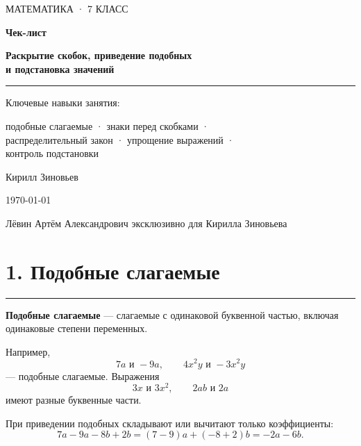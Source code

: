 \documentclass[a4paper,12pt]{article}
\newcommand{\topicline}{\par\noindent\color{accent}\rule{\linewidth}{0.6pt}\color{black}\par}
\newcommand{\term}[1]{\textbf{\color{darkaccent}#1}}
\begin{document}
\begin{titlepage}
\thispagestyle{empty}
\begin{center}
\vspace*{1.8cm}
{\large\color{textgray}МАТЕМАТИКА · 7 КЛАСС\par}
\vspace{1.2cm}
{\Huge\bfseries\color{darkaccent}Чек-лист\par}
\vspace{0.45cm}
{\LARGE\bfseries Раскрытие скобок, приведение подобных\\[0.15cm] и подстановка значений\par}
\vspace{1cm}
\topicline
\vspace{0.9cm}
{\large Ключевые навыки занятия:\par}
\vspace{0.3cm}
{\large подобные слагаемые · знаки перед скобками ·\\ распределительный закон · упрощение выражений ·\\ контроль подстановки\par}
\vfill
{\large Кирилл Зиновьев\par}
\vspace{0.35cm}
{\normalsize \today\par}
\vspace{1cm}
{\normalsize Лёвин Артём Александрович эксклюзивно для Кирилла Зиновьева\par}
\vspace{1.4cm}
\end{center}
\end{titlepage}

\section*{1. Подобные слагаемые}
\topicline
\term{Подобные слагаемые} --- слагаемые с одинаковой буквенной частью, включая одинаковые степени переменных.

Например,
\[
7a \text{ и } -9a,\qquad 4x^2y \text{ и } -3x^2y
\]
--- подобные слагаемые. Выражения
\[
3x \text{ и } 3x^2,\qquad 2ab \text{ и } 2a
\]
имеют разные буквенные части.

При приведении подобных складывают или вычитают только коэффициенты:
\[
7a-9a-8b+2b=(7-9)a+(-8+2)b=-2a-6b.
\]
\end{document}

